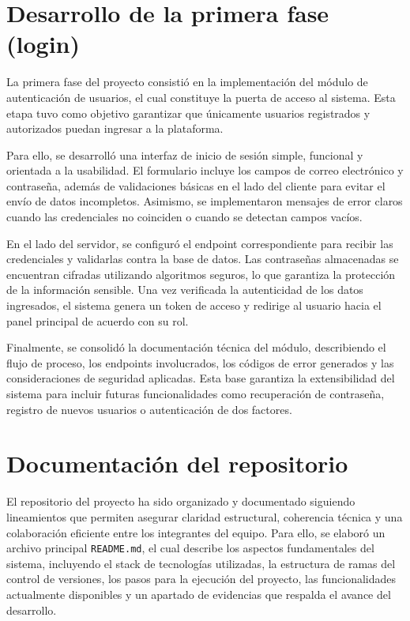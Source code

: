 \documentclass[12pt, a4paper]{article}
\begin{document}
\section{Desarrollo de la primera fase (login)}
La primera fase del proyecto consistió en la implementación del módulo de autenticación de usuarios, el cual constituye la puerta de acceso al sistema. Esta etapa tuvo como objetivo garantizar que únicamente usuarios registrados y autorizados puedan ingresar a la plataforma.

Para ello, se desarrolló una interfaz de inicio de sesión simple, funcional y orientada a la usabilidad. El formulario incluye los campos de correo electrónico y contraseña, además de validaciones básicas en el lado del cliente para evitar el envío de datos incompletos. Asimismo, se implementaron mensajes de error claros cuando las credenciales no coinciden o cuando se detectan campos vacíos.

En el lado del servidor, se configuró el endpoint correspondiente para recibir las credenciales y validarlas contra la base de datos. Las contraseñas almacenadas se encuentran cifradas utilizando algoritmos seguros, lo que garantiza la protección de la información sensible. Una vez verificada la autenticidad de los datos ingresados, el sistema genera un token de acceso y redirige al usuario hacia el panel principal de acuerdo con su rol.

Finalmente, se consolidó la documentación técnica del módulo, describiendo el flujo de proceso, los endpoints involucrados, los códigos de error generados y las consideraciones de seguridad aplicadas. Esta base garantiza la extensibilidad del sistema para incluir futuras funcionalidades como recuperación de contraseña, registro de nuevos usuarios o autenticación de dos factores.
\section{Documentación del repositorio}
El repositorio del proyecto ha sido organizado y documentado siguiendo lineamientos que permiten asegurar claridad estructural, coherencia técnica y una colaboración eficiente entre los integrantes del equipo. Para ello, se elaboró un archivo principal \texttt{README.md}, el cual describe los aspectos fundamentales del sistema, incluyendo el stack de tecnologías utilizadas, la estructura de ramas del control de versiones, los pasos para la ejecución del proyecto, las funcionalidades actualmente disponibles y un apartado de evidencias que respalda el avance del desarrollo.
\end{document}
